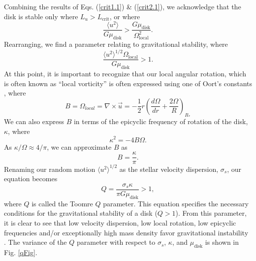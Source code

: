 \documentclass[aps,pra, twocolumn]{revtex4-1}
\begin{document}
Combining the results of Eqs. (\ref{crit1.1}) \& (\ref{crit2.1}), we acknowledge that the disk is stable only where $L_u > L_\text{crit}$, or where
\begin{equation}
\frac{\langle u^2 \rangle}{G\mu_\text{disk}} > \frac{G \mu_\text{disk}}{\Omega_\text{local}^2} \nonumber.
\end{equation}
Rearranging, we find a parameter relating to gravitational stability, where \cite{whittle2010}
\begin{equation}
\frac{\langle u^2 \rangle^{1/2} \Omega_\text{local}}{G\mu_\text{disk}} > 1.
\end{equation}
At this point, it is important to recognize that our local angular rotation, which is often known as ``local vorticity'' is often expressed using one of Oort's constants \cite{whittle2010}, where
\begin{equation}
B = \Omega_{local} = \nabla \times \vec{u} = -\frac{1}{2}r\left(\frac{d\Omega}{dr} + \frac{2\Omega}{R}  \right)_{R_*}
\end{equation}
We can also express $B$ in terms of the epicyclic frequency of rotation of the disk, $\kappa$, where \cite{whittle2010}
\begin{equation}
\kappa^2 = -4B\Omega.
\end{equation}
As $\kappa/\Omega \approx 4/\pi$, we can approximate $B$ as
\begin{equation}
B = \frac{\kappa}{\pi}.
\end{equation}
Renaming our random motion $\langle u^2 \rangle ^{1/2}$ as the stellar velocity dispersion, $\sigma_s$, our equation becomes
\begin{equation}
Q = \frac{\sigma_s \kappa}{\pi G\mu_\text{disk}} > 1, \label{qParam}
\end{equation}
where $Q$ is called the Toomre $Q$ parameter.  This equation specifies the necessary conditions for the gravitational stability of a disk ($Q > 1$).  From this parameter, it is clear to see that low velocity dispersion, low local rotation, low epicyclic frequencies and/or exceptionally high mass density favor gravitational instability \cite{whittle2010}.  The variance of the $Q$ parameter with respect to $\sigma_s$, $\kappa$, and $\mu_\text{disk}$ is shown in Fig. \ref{qFig}.
\end{document}
